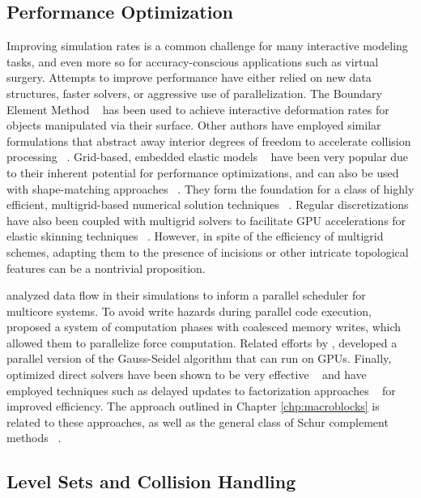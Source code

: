 \subsection{Performance Optimization}
Improving simulation rates is a common challenge for many interactive
modeling tasks, and even more so for accuracy-conscious applications
such as virtual surgery. Attempts to improve performance have either
relied on new data structures, faster solvers, or aggressive use of
parallelization. The Boundary Element Method ~\citep{JamesP:1999} has
been used to achieve interactive deformation rates for objects
manipulated via their surface. Other authors have employed similar
formulations that abstract away interior degrees of freedom to
accelerate collision processing ~\citep{GaoMS:2014}. Grid-based,
embedded elastic models
~\citep{MuellTG:2004,NesmePF:2006,McAdaZSETTS:2011,PatteMS:2012,MitchCS:2015}
have been very popular due to their inherent potential for performance
optimizations, and can also be used with shape-matching approaches
~\citep{RiverJ:2007}. They form the foundation for a class of highly
efficient, multigrid-based numerical solution techniques
~\citep{ZhuSTB:2010,GeorgW:2008,DickGW:2011}.  Regular discretizations
have also been coupled with multigrid solvers to facilitate GPU
accelerations for elastic skinning techniques ~\citep{McAdaST:2010}.
However, in spite of the efficiency of multigrid schemes, adapting
them to the presence of incisions or other intricate topological
features can be a nontrivial proposition.

\citet{HermaRF:2009} analyzed data flow in their
simulations to inform a parallel scheduler for multicore systems. To
avoid write hazards during parallel code execution, 
\citet{KimP:2011} proposed a system of computation phases with
coalesced memory writes, which allowed them to parallelize force
computation. Related efforts by 
\citet{CourtA:2009}, developed a parallel version of the
Gauss-Seidel algorithm that can run on GPUs. Finally, optimized direct
solvers have been shown to be very effective ~\citep{SinSB:2013} and
have employed techniques such as delayed updates to factorization
approaches ~\citep{HechtLSO:2012} for improved efficiency. The
approach outlined in Chapter \ref{chp:macroblocks} is related to these
approaches, as well as the general class of Schur complement methods
~\citep{QuartV:1999}.

\subsection{Level Sets and Collision Handling}


